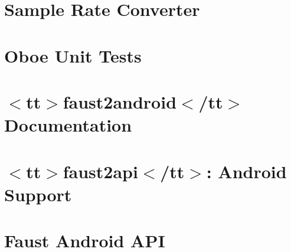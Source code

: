 \let\mypdfximage\pdfximage\def\pdfximage{\immediate\mypdfximage}\documentclass[twoside]{book}
\newcommand{\+}{\discretionary{\mbox{\scriptsize$\hookleftarrow$}}{}{}}
\begin{document}
\chapter{Sample Rate Converter}
\label{md__c_1__users_fab_src__github_branches__neural_amp_modeler_plugin_i_plug2__dependencies__build_9d15522aa58eaf0c10ba7b97bb227992}

\chapter{Oboe Unit Tests}
\label{md__c_1__users_fab_src__github_branches__neural_amp_modeler_plugin_i_plug2__dependencies__build_087fc68db3d8ef9691dfb300ed33a6d2}

\chapter{$<$tt$>$faust2android$<$/tt$>$ Documentation}
\label{md__c_1__users_fab_src__github_branches__neural_amp_modeler_plugin_i_plug2__dependencies__build_5c8c1117a810c924c135ff124fa08c5e}

\chapter{$<$tt$>$faust2api$<$/tt$>$\+: Android Support}
\label{md__c_1__users_fab_src__github_branches__neural_amp_modeler_plugin_i_plug2__dependencies__build_a89e217ea15358dcdbd2598e172f7a1d}

\chapter{Faust Android A\+PI}
\label{md__c_1__users_fab_src__github_branches__neural_amp_modeler_plugin_i_plug2__dependencies__build_c1c1a29dea99eab459a3d0a3834ac225}

\end{document}

